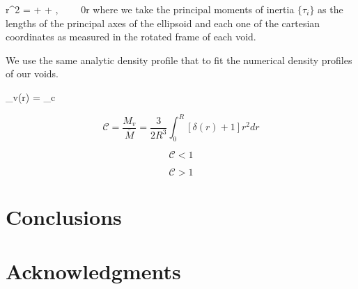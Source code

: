 \documentclass[a4,useAMS,usenatbib,usegraphicx]{latex/mn2e}
\begin{document}
{
r^2 =  +  + ,
\ \ \ \ 0\leq r 
}
where we take the principal moments of inertia $\{\tau_i \}$ as the 
lengths of the principal axes of the ellipsoid and each one of the 
cartesian coordinates as measured in the rotated frame of each void.


We use the same analytic density profile that \SRKED{[Hamaous, et.al 2014]} 
to fit the numerical density profiles of our voids.


{
\delta_v(r) = \delta_c
}


\[ \mathcal{C} = \frac{M_v}{\overline{M}} = \frac{3}{2R^{3}} \int_0^{R} [\delta(r) + 1] r^2 dr \]

\[ \mathcal{C} < 1 \]

\[ \mathcal{C} > 1 \]


\section{Conclusions}
\label{sec:conclusions}


\section*{Acknowledgments}  




\end{document}
